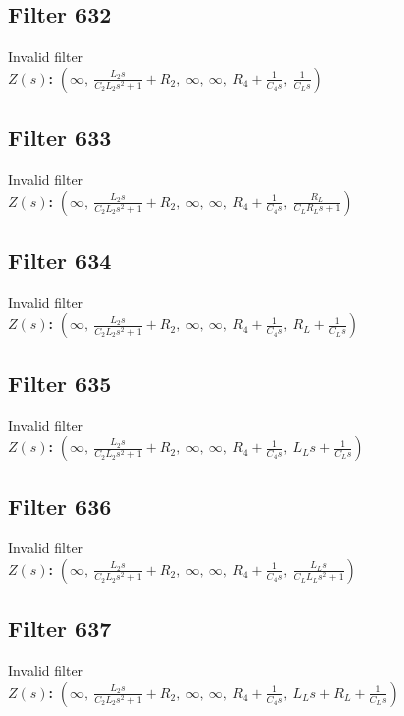 \documentclass{article}
\begin{document}
\subsection*{Filter 632}
Invalid filter \\ 
\textbf{$Z(s)$:} $\left( \infty, \  \frac{L_{2} s}{C_{2} L_{2} s^{2} + 1} + R_{2}, \  \infty, \  \infty, \  R_{4} + \frac{1}{C_{4} s}, \  \frac{1}{C_{L} s}\right)$ \\ 
\subsection*{Filter 633}
Invalid filter \\ 
\textbf{$Z(s)$:} $\left( \infty, \  \frac{L_{2} s}{C_{2} L_{2} s^{2} + 1} + R_{2}, \  \infty, \  \infty, \  R_{4} + \frac{1}{C_{4} s}, \  \frac{R_{L}}{C_{L} R_{L} s + 1}\right)$ \\ 
\subsection*{Filter 634}
Invalid filter \\ 
\textbf{$Z(s)$:} $\left( \infty, \  \frac{L_{2} s}{C_{2} L_{2} s^{2} + 1} + R_{2}, \  \infty, \  \infty, \  R_{4} + \frac{1}{C_{4} s}, \  R_{L} + \frac{1}{C_{L} s}\right)$ \\ 
\subsection*{Filter 635}
Invalid filter \\ 
\textbf{$Z(s)$:} $\left( \infty, \  \frac{L_{2} s}{C_{2} L_{2} s^{2} + 1} + R_{2}, \  \infty, \  \infty, \  R_{4} + \frac{1}{C_{4} s}, \  L_{L} s + \frac{1}{C_{L} s}\right)$ \\ 
\subsection*{Filter 636}
Invalid filter \\ 
\textbf{$Z(s)$:} $\left( \infty, \  \frac{L_{2} s}{C_{2} L_{2} s^{2} + 1} + R_{2}, \  \infty, \  \infty, \  R_{4} + \frac{1}{C_{4} s}, \  \frac{L_{L} s}{C_{L} L_{L} s^{2} + 1}\right)$ \\ 
\subsection*{Filter 637}
Invalid filter \\ 
\textbf{$Z(s)$:} $\left( \infty, \  \frac{L_{2} s}{C_{2} L_{2} s^{2} + 1} + R_{2}, \  \infty, \  \infty, \  R_{4} + \frac{1}{C_{4} s}, \  L_{L} s + R_{L} + \frac{1}{C_{L} s}\right)$ \\ 
\end{document}
